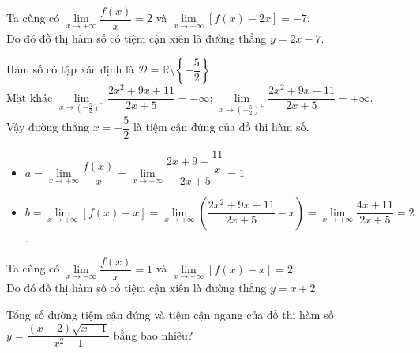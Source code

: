 \begin{bt}
{\begin{listEX}
\begin{itemize}
			\end{itemize}
			Ta cũng có $\lim\limits_{x \to +\infty} \dfrac{f(x)}{x} = 2$ và $\lim\limits_{x \to +\infty} \left[f(x) - 2x  \right] = -7$.\\
			Do đó đồ thị hàm số có tiệm cận xiên là đường thẳng  $y = 2x - 7$.
			\item Hàm số có tập xác định là  $\mathscr{D}=\mathbb{R}\setminus \left\{-\dfrac{5}{2}\right\}$.\\
			Mặt khác $\lim\limits_{x  \to \left(-\frac{5}{2}\right)^-}\dfrac{2x^2+9x+11}{2x+5}=-\infty$; $\lim\limits_{x \to \left(-\frac{5}{2}\right)^+}\dfrac{2x^2+9x+11}{2x+5}=+\infty$.\\
			Vậy đường  thẳng $x=-\dfrac{5}{2}$ là tiệm cận đứng của đồ thị hàm số.
			\begin{itemize}
				 \item
				 $a=\lim\limits_{x \to +\infty}\dfrac{f(x)}{x}=\lim\limits_{x \to +\infty}\dfrac{2x+9+\dfrac{11}{x}}{2x+5}=1$
				\item 
				$b=\lim\limits_{x \to +\infty}\left[f(x)-x\right]=\lim\limits_{x \to +\infty}\left(\dfrac{2x^2+9x+11}{2x+5}-x\right)=\lim\limits_{x  \to +\infty}\dfrac{4x+11}{2x+5}=2$.
			\end{itemize}
			Ta cũng  có $\lim\limits_{x \to -\infty}\dfrac{f(x)}{x}=1$ và $\lim\limits_{x \to -\infty}\left[f(x)-x\right]=2$.\\
			Do đó đồ thị hàm số có tiệm cận  xiên là đường thẳng $y=x+2$.
		\end{listEX}
	} 
\end{bt}

\begin{bt}%
	Tổng số đường tiệm cận đứng và  tiệm cận ngang của đồ thị hàm số \break $y = \dfrac{(x-2)\sqrt{x-1}}{x^2 - 1}$ bằng bao nhiêu?
\end{bt}

